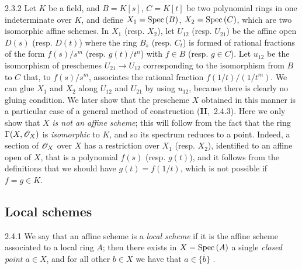 \begin{env}[Example]{2.3.2}
\label{exm-1.2.3.2}
Let $K$ be a field, and $B=K[s]$, $C=K[t]$ be two polynomial rings in one indeterminate over
$K$, and define $X_1={\mathop{\mathrm{Spec}}\nolimits}\,(B)$, $X_2={\mathop{\mathrm{Spec}}\nolimits}\,(C)$, which are two isomorphic affine schemes. In
$X_1$ (resp. $X_2$), let $U_{12}$ (resp. $U_{21}$) be the affine open $D(s)$ (resp. $D(t)$)
where the ring $B_s$ (resp. $C_t$) is formed of rational fractions of the form $f(s)/s^m$
(resp. $g(t)/t^n$) with $f\in B$ (resp. $g\in C$). Let $u_{12}$ be the isomorphism of
preschemes $U_{21}\to U_{12}$ corresponding  to the isomorphism from $B$ to
$C$ that, to $f(s)/s^m$, associates the rational fraction $f(1/t)/(1/t^m)$. We can glue $X_1$
and $X_2$ along $U_{12}$ and $U_{21}$ by using $u_{12}$, because there is clearly no gluing
condition. We later show that the prescheme $X$ obtained in this manner is a particular case
of a general method of construction (\textbf{II},~2.4.3). Here we only show that $X$ \emph{is
not an affine scheme}; this will follow from the fact that the ring $\Gamma(X,\mathscr{O}_X)$ is
\emph{isomorphic} to $K$, and so its spectrum reduces to a point. Indeed, a section of
$\mathscr{O}_X$ over $X$ has a restriction over $X_1$ (resp. $X_2$), identified to an affine open of
$X$, that is a polynomial $f(s)$ (resp. $g(t)$), and it follows from the definitions that we
should have $g(t)=f(1/t)$, which is not possible if $f=g\in K$.
\end{env}

\subsection{Local schemes}
\label{1-schemes-2.4}

\begin{env}{2.4.1}
\label{env-1.2.4.1}
We say that an affine scheme is a \emph{local scheme} if
it is the affine scheme associated to a local ring $A$; then there exists in
$X={\mathop{\mathrm{Spec}}\nolimits}\,(A)$ a single \emph{closed point $a\in X$}, and for all other $b\in X$
we have that $a\in\overline{\{b\}}$ .
\end{env}
    
